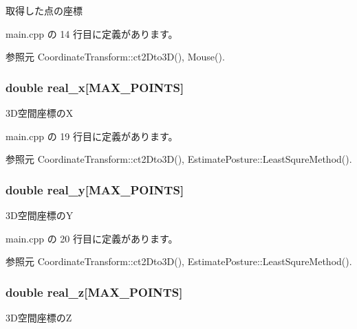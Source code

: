 取得した点の座標 



 main.\-cpp の 14 行目に定義があります。



参照元 Coordinate\-Transform\-::ct2\-Dto3\-D(), Mouse().

\subsubsection[{real\-\_\-x}]{\setlength{\rightskip}{0pt plus 5cm}double real\-\_\-x[{\bf M\-A\-X\-\_\-\-P\-O\-I\-N\-T\-S}]}\label{main_8cpp_a3a44d2bc2273e220bc5ade2bc217d33a}


3\-D空間座標の\-X 



 main.\-cpp の 19 行目に定義があります。



参照元 Coordinate\-Transform\-::ct2\-Dto3\-D(), Estimate\-Posture\-::\-Least\-Squre\-Method().

\subsubsection[{real\-\_\-y}]{\setlength{\rightskip}{0pt plus 5cm}double real\-\_\-y[{\bf M\-A\-X\-\_\-\-P\-O\-I\-N\-T\-S}]}\label{main_8cpp_aac94948837fe999fddb50973fa27e450}


3\-D空間座標の\-Y 



 main.\-cpp の 20 行目に定義があります。



参照元 Coordinate\-Transform\-::ct2\-Dto3\-D(), Estimate\-Posture\-::\-Least\-Squre\-Method().

\subsubsection[{real\-\_\-z}]{\setlength{\rightskip}{0pt plus 5cm}double real\-\_\-z[{\bf M\-A\-X\-\_\-\-P\-O\-I\-N\-T\-S}]}\label{main_8cpp_ad04bdcf4918f232afcf6cccf8937f53b}


3\-D空間座標の\-Z 



